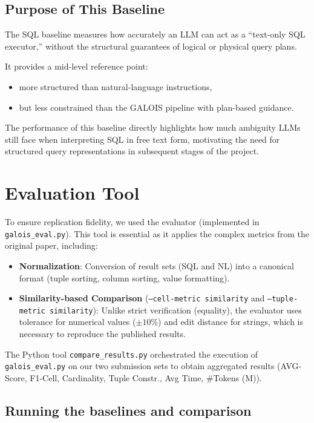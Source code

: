 \documentclass[12pt]{article}
\begin{document}
\subsection{Purpose of This Baseline}

The SQL baseline measures how accurately an LLM can act as a ``text-only SQL executor,'' without the structural guarantees of logical or physical query plans.

It provides a mid-level reference point:
\begin{itemize}
    \item more structured than natural-language instructions,
    \item but less constrained than the GALOIS pipeline with plan-based guidance.
\end{itemize}

The performance of this baseline directly highlights how much ambiguity LLMs still face when interpreting SQL in free text form, motivating the need for structured query representations in subsequent stages of the project.



\section{Evaluation Tool}

To ensure replication fidelity, we used the evaluator (implemented in \texttt{galois\_eval.py}). This tool is essential as it applies the complex metrics from the original paper, including:

\begin{itemize}
    \item \textbf{Normalization}: Conversion of result sets (SQL and NL) into a canonical format (tuple sorting, column sorting, value formatting).
    \item \textbf{Similarity-based Comparison} (\texttt{--cell-metric similarity} and \texttt{--tuple-metric similarity}): Unlike strict verification (equality), the evaluator uses tolerance for numerical values ($\pm 10\%$) and edit distance for strings, which is necessary to reproduce the published results.
\end{itemize}

The Python tool \texttt{compare\_results.py} orchestrated the execution of \texttt{galois\_eval.py} on our two submission sets to obtain aggregated results (AVG-Score, F1-Cell, Cardinality, Tuple Constr., Avg Time, \#Tokens (M)).

\subsection{Running the baselines and comparison}
\label{subsec:run-baselines}
\end{document}
